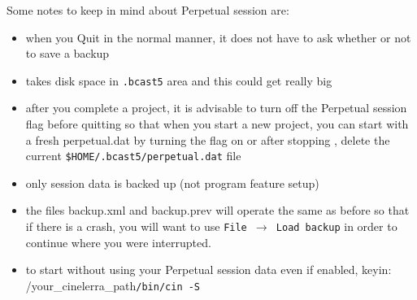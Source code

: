 Some notes to keep in mind about Perpetual session are:

\begin{itemize}
    \item when you Quit in the normal manner, it does not have to ask whether or not to save a backup
    \item takes disk space in \texttt{.bcast5} area and this could get really big
    \item after you complete a project, it is advisable to turn off the Perpetual session flag before quitting so
    that when you start a new project, you can start with a fresh perpetual.dat by turning the flag on or
    after stopping \CGG{}, delete the current \texttt{\$HOME/.bcast5/perpetual.dat} file
    \item only session data is backed up (not program feature setup)
    \item the files backup.xml and backup.prev will operate the same as before so that if there is a crash, you
    will want to use \texttt{File $\rightarrow$ Load backup} in order to continue where you were interrupted.
    \item to start \CGG{} without using your Perpetual session data even if enabled, keyin: /your\_cinelerra\_path\texttt{/bin/cin -S}
\end{itemize}



